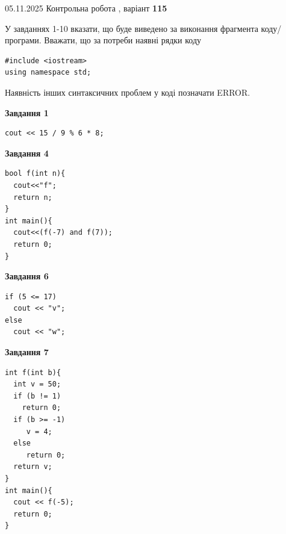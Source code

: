 \documentclass[12pt, ukrainian]{article}
\begin{document}
{\Large{05.11.2025 Контрольна робота , варіант  \No \textbf { 115 }\par}}
{
\begin {large}
У завданнях 1-10 вказати, що буде виведено за виконання фрагмента коду/про\-гра\-ми.
Вважати, що за потреби наявні рядки коду
\begin{verbatim}
#include <iostream>
using namespace std;
\end{verbatim}
Наявність інших синтаксичних проблем у коді позначати ERROR.

\begin{minipage}[t]{7.0cm}

\begin{center}
\textbf{Завдання 1}
\end{center}
\vspace{-8mm}

\begin{verbatim}
cout << 15 / 9 % 6 * 8;
\end{verbatim}



\begin{center}
\textbf{Завдання 4}
\end{center}
\vspace{-8mm}

\begin{verbatim}
bool f(int n){
  cout<<"f";
  return n;
}
int main(){
  cout<<(f(-7) and f(7));
  return 0;
}
\end{verbatim}



\begin{center}
\textbf{Завдання 6}
\end{center}
\vspace{-8mm}

\begin{verbatim}
if (5 <= 17)
  cout << "v";
else
  cout << "w";
\end{verbatim}



\begin{center}
\textbf{Завдання 7}
\end{center}
\vspace{-8mm}

\begin{verbatim}
int f(int b){
  int v = 50;
  if (b != 1)
    return 0;
  if (b >= -1)
     v = 4;
  else
     return 0;
  return v;
}
int main(){
  cout << f(-5);
  return 0;
}
\end{verbatim}


\end{minipage}
\end{large}}
\end{document}
